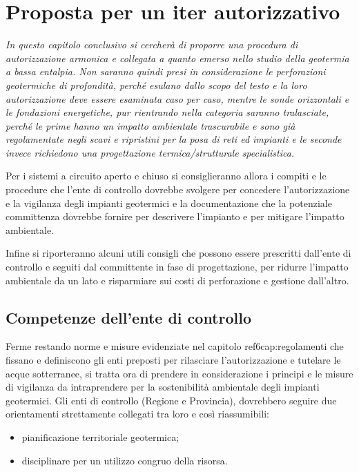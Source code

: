 \chapter{Proposta per un iter autorizzativo} %

\begin{preamble}
{\em In questo capitolo conclusivo si cercherà di proporre una procedura di autorizzazione armonica e collegata a quanto emerso nello studio della geotermia a bassa entalpia. Non saranno quindi presi in considerazione le perforazioni geotermiche di profondità, perché esulano dallo scopo del testo e la loro autorizzazione deve essere esaminata caso per caso, mentre le sonde orizzontali e le fondazioni energetiche, pur rientrando nella categoria saranno tralasciate, perché le prime hanno un impatto ambientale trascurabile e sono già regolamentate negli scavi e ripristini per la posa di reti ed impianti e le seconde invece richiedono una progettazione termica/strutturale specialistica.

Per i sistemi a circuito aperto e chiuso si consiglieranno allora i compiti e le procedure che l'ente di controllo dovrebbe svolgere per concedere l'autorizzazione e la vigilanza degli impianti geotermici e la documentazione che la potenziale committenza dovrebbe fornire per descrivere l'impianto e per mitigare l'impatto ambientale.

Infine si riporteranno alcuni utili consigli che possono essere prescritti dall'ente di controllo e seguiti dal committente in fase di progettazione, per ridurre l'impatto ambientale da un lato e risparmiare sui costi di perforazione e gestione dall'altro.}
\end{preamble}

\section{Competenze dell'ente di controllo}
Ferme restando norme e misure evidenziate nel capitolo ref{6cap:regolamenti} che fissano e definiscono gli enti preposti per rilasciare l'autorizzazione e tutelare le acque sotterranee, si tratta ora di prendere in considerazione i principi e le misure di vigilanza da intraprendere per la sostenibilità ambientale degli impianti geotermici. Gli enti di controllo (Regione e Provincia), dovrebbero seguire due orientamenti strettamente collegati tra loro e così riassumibili:
\begin{itemize}
\item pianificazione territoriale geotermica;
\item disciplinare per un utilizzo congruo della risorsa.
\end{itemize}

